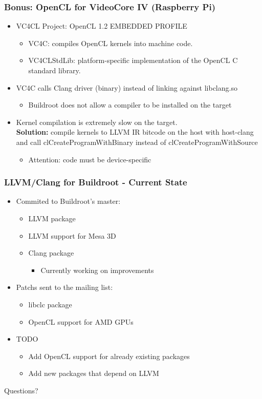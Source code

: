\documentclass{beamer}
\begin{document}
\begin{frame}
\frametitle{Bonus: OpenCL for VideoCore IV (Raspberry Pi)}
\begin{itemize}
  \item VC4CL Project: OpenCL 1.2 EMBEDDED PROFILE
  \begin{itemize}
    \item VC4C: compiles OpenCL kernels into machine code.
    \item VC4CLStdLib: platform-specific implementation of the OpenCL C standard
    library.
  \end{itemize}
  \item VC4C calls Clang driver (binary) instead of linking against libclang.so
  \begin{itemize}
    \item Buildroot does not allow a compiler to be installed on the target
  \end{itemize}
  \item Kernel compilation is extremely slow on the target.\\
  \textbf{Solution:} compile kernels to LLVM IR bitcode on the host with host-clang and
  call {\selectfont clCreateProgramWithBinary} instead of
  {\selectfont clCreateProgramWithSource}
  \begin{itemize}
    \item Attention: code must be device-specific
  \end{itemize}
\end{itemize}
\end{frame}

\begin{frame}
\frametitle{LLVM/Clang for Buildroot - Current State}
\begin{itemize}
  \item Commited to Buildroot's master:
  \begin{itemize}
    \item LLVM package \checkmark
    \item LLVM support for Mesa 3D \checkmark
    \item Clang package \checkmark
    \begin{itemize}
      \item Currently working on improvements
    \end{itemize}
  \end{itemize}
  \item Patchs sent to the mailing list:
  \begin{itemize}
    \item libclc package
    \item OpenCL support for AMD GPUs
  \end{itemize}
  \item TODO
  \begin{itemize}
    \item Add OpenCL support for already existing packages
    \item Add new packages that depend on LLVM
  \end{itemize}
\end{itemize}
\end{frame}

\begin{frame}
\Huge{\centerline{Questions?}}
\end{frame}
\end{document}
